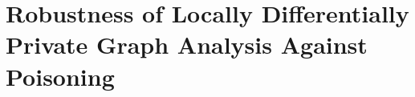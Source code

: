 \graphicspath{{./chapters/chapter4}}

\chapter{Robustness of Locally Differentially Private Graph Analysis Against Poisoning}













